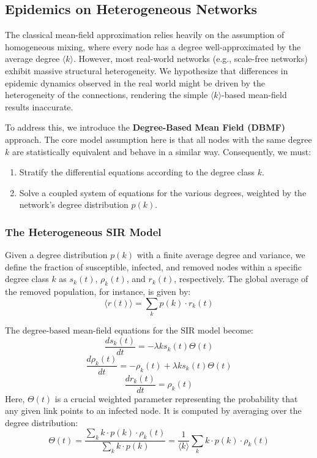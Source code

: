 \subsection{Epidemics on Heterogeneous Networks}
\label{subsec:heterogeneous_networks}

The classical mean-field approximation relies heavily on the assumption of homogeneous mixing, where every node has a degree well-approximated by the average degree \(\langle k \rangle\). However, most real-world networks (e.g., scale-free networks) exhibit massive structural heterogeneity. We hypothesize that differences in epidemic dynamics observed in the real world might be driven by the heterogeneity of the connections, rendering the simple \(\langle k \rangle\)-based mean-field results inaccurate.

To address this, we introduce the \textbf{Degree-Based Mean Field (DBMF)} approach. The core model assumption here is that all nodes with the same degree \(k\) are statistically equivalent and behave in a similar way. Consequently, we must:
\begin{enumerate}
    \item Stratify the differential equations according to the degree class \(k\).
    \item Solve a coupled system of equations for the various degrees, weighted by the network's degree distribution \(p(k)\).
\end{enumerate}

\subsubsection{The Heterogeneous SIR Model}

Given a degree distribution \(p(k)\) with a finite average degree and variance, we define the fraction of susceptible, infected, and removed nodes within a specific degree class \(k\) as \(s_k(t)\), \(\rho_k(t)\), and \(r_k(t)\), respectively. The global average of the removed population, for instance, is given by:
\[
    \langle r(t) \rangle = \sum_k p(k) \cdot r_k(t)
\]

The degree-based mean-field equations for the SIR model become:
\[
    \frac{ds_k(t)}{dt} = -\lambda k s_k(t) \Theta(t)
\]
\[
    \frac{d\rho_k(t)}{dt} = -\rho_k(t) + \lambda k s_k(t) \Theta(t)
\]
\[
    \frac{dr_k(t)}{dt} = \rho_k(t)
\]
Here, \(\Theta(t)\) is a crucial weighted parameter representing the probability that any given link points to an infected node. It is computed by averaging over the degree distribution:
\[
    \Theta(t) = \frac{\sum_k k \cdot p(k) \cdot \rho_k(t)}{\sum_k k \cdot p(k)} = \frac{1}{\langle k \rangle} \sum_k k \cdot p(k) \cdot \rho_k(t)
\]

